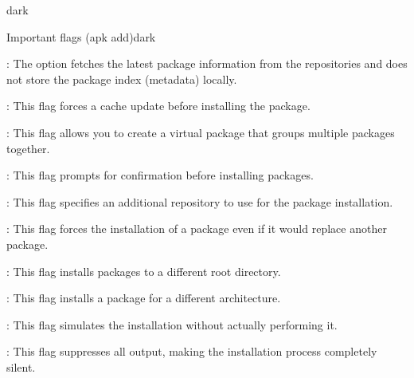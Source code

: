 \begin{baseBoxThree}{}{dark}
    \begin{baseBoxThree}{Important flags (apk add)}{dark}
        \smallskip
        \label{apk add}
        \begin{posnexItemize}            
            \item[\sA] : The option fetches the latest package information from the repositories and does not store the package index (metadata) locally.
            \item[\sA] : This flag forces a cache update before installing the package.
            \item[\sA] : This flag allows you to create a virtual package that groups multiple packages together.
            \item[\sA] : This flag prompts for confirmation before installing packages.
            \item[\sA] : This flag specifies an additional repository to use for the package installation.
            \item[\sA] : This flag forces the installation of a package even if it would replace another package.
            \item[\sA] : This flag installs packages to a different root directory.
            \item[\sA] : This flag installs a package for a different architecture.
            \item[\sA] : This flag simulates the installation without actually performing it.
            \item[\sA] : This flag suppresses all output, making the installation process completely silent.
        \end{posnexItemize}
        \smallskip
    \end{baseBoxThree}
    \smallskip
\end{baseBoxThree}

